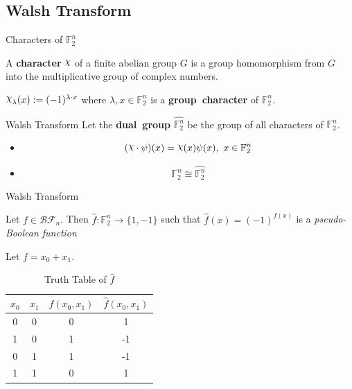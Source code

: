 \documentclass{beamer}
\def\gftwo{\mathbb{F}_2}
\def\BF{\mathcal{BF}}
\def\Chi{\raisebox{2pt}{$\chi$}}
\begin{document}
\subsection{Walsh Transform}
\begin{frame}{Characters of $\gftwo^n$}
\begin{definition}
  A {\bf character} $\Chi$ of a finite abelian group $G$ is a group
  homomorphism from $G$ into the multiplicative group of complex numbers.
\end{definition}
  \begin{fact}
    $\Chi_\lambda(x):=(-1)^{\lambda\cdot x}$ where $\lambda,x\in\gftwo^n$ is a
    {\bf group\ character} of $\gftwo^n$.
  \end{fact}
\end{frame}
\begin{frame}{Walsh Transform}
  Let the {\bf dual\ group} $\hat{\gftwo^n}$ be the group of all
  characters of $\gftwo^n$.
  \begin{itemize}
      \pause
    \item[] \[ (\Chi\cdot\psi)(x)=\Chi(x)\psi(x),\ x\in\gftwo^n  \]
      \pause
    \item[] \[\gftwo^n\cong\hat{\gftwo^n}\]
  \end{itemize}
\end{frame}

\begin{frame}{Walsh Transform}
  \begin{definition}\label{def:pBF}
    Let $f\in\BF_n$. Then $\hat{f}:\gftwo^n\rightarrow\{1,-1\}$ such that
    $\hat{f}(x)=(-1)^{f(x)}$ is a \textit{pseudo-Boolean function}
  \end{definition}
  \begin{example}
    Let $f=x_0+x_1$.
    \begin{table}
    \label{tab:truth-table}
    	\centering
      \begin{tabular}{|c|c||c|c|}
        \hline
        $x_0$&$x_1$&$f(x_0,x_1)$&$\hat{f}(x_0,x_1)$\\
        \hline
        0&0&0&1\\
        1&0&1&-1\\
        0&1&1&-1\\
        1&1&0&1\\
      	\hline
    	\end{tabular}
      \caption{Truth Table of $\hat{f}$}
    \end{table}
  \end{example}
\end{frame}
\end{document}
